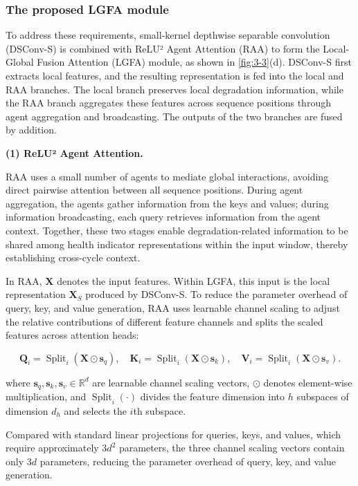 \subsubsection{The proposed LGFA module}

To address these requirements, small-kernel depthwise separable convolution (DSConv-S) is combined with ReLU² Agent Attention (RAA) to form the Local-Global Fusion Attention (LGFA) module, as shown in \cref{fig:3-3}(d). DSConv-S first extracts local features, and the resulting representation is fed into the local and RAA branches. The local branch preserves local degradation information, while the RAA branch aggregates these features across sequence positions through agent aggregation and broadcasting. The outputs of the two branches are fused by addition.

\textbf{(1) ReLU² Agent Attention.}

RAA uses a small number of agents to mediate global interactions, avoiding direct pairwise attention between all sequence positions\cite{ref46}. During agent aggregation, the agents gather information from the keys and values; during information broadcasting, each query retrieves information from the agent context. Together, these two stages enable degradation-related information to be shared among health indicator representations within the input window, thereby establishing cross-cycle context.

In RAA, $\mathbf X$ denotes the input features. Within LGFA, this input is the local representation $\mathbf X_S$ produced by DSConv-S. To reduce the parameter overhead of query, key, and value generation, RAA uses learnable channel scaling to adjust the relative contributions of different feature channels and splits the scaled features across attention heads:

\begin{equation}
\mathbf Q_i=\operatorname{Split}_i(\mathbf X\odot\mathbf s_q),\quad
\mathbf K_i=\operatorname{Split}_i(\mathbf X\odot\mathbf s_k),\quad
\mathbf V_i=\operatorname{Split}_i(\mathbf X\odot\mathbf s_v).
\label{eq:raa_qkv_scaling}
\end{equation}

where $\mathbf s_q,\mathbf s_k,\mathbf s_v\in\mathbb R^d$ are learnable channel scaling vectors, $\odot$ denotes element-wise multiplication, and $\operatorname{Split}_i(\cdot)$ divides the feature dimension into $h$ subspaces of dimension $d_h$ and selects the $i$th subspace.

Compared with standard linear projections for queries, keys, and values, which require approximately $3d^2$ parameters, the three channel scaling vectors contain only $3d$ parameters, reducing the parameter overhead of query, key, and value generation.

